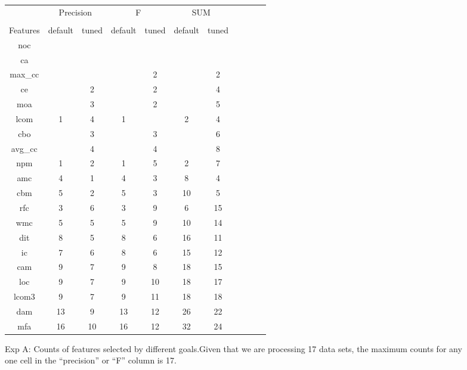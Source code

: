 \documentclass{acm_proc_article-sp}
\begin{document}
\begin{figure}[!t]

\renewcommand{\baselinestretch}{0.8}
\scriptsize
\centering
  \begin{tabular}{c|c c|c c|c c|c c| c c }
  
    &   \multicolumn{2}{c|}{Precision} & \multicolumn{2}{c|}{F} &  \multicolumn{2}{c|}{SUM}\\
 &&&&&&&\\
Features&   
  default
& tuned
& default
& tuned
& default
& tuned
\\\hline
 
noc &  &  &  &  & & & \\
ca & &  &  &  &  &\\
max\_cc&  &  & & 2& & 2\\
ce& & 2& & 2&  &   4\\
moa& & 3& & 2& &  5\\
lcom& 1& 4& 1& & 2 & 4\\
cbo& & 3& & 3& &  6\\
avg\_cc & & 4& & 4& &  8\\
npm& 1& 2& 1& 5& 2& 7\\
amc& 4& 1& 4& 3& 8&4\\
cbm& 5& 2& 5& 3&10 &  5\\
rfc& 3& 6& 3& 9& 6 &  15\\
wmc& 5& 5& 5& 9& 10& 14\\
dit& 8& 5& 8& 6& 16 & 11\\
ic& 7& 6& 8& 6& 15&  12\\
cam& 9& 7& 9& 8& 18& 15\\
loc& 9& 7& 9& 10& 18 &  17\\
lcom3& 9& 7& 9& 11& 18 & 18\\
dam& 13& 9& 13& 12& 26 &  22\\
mfa& 16& 10& 16& 12& 32 &  24\\

  \end{tabular}
    \caption{ Exp A: Counts of features selected by different goals.Given that we are processing 17 data sets, the maximum counts for any 
one cell in the ``precision'' or ``F'' column is 17.  
    }\label{fig:counts}
\end{figure}
\end{document}
